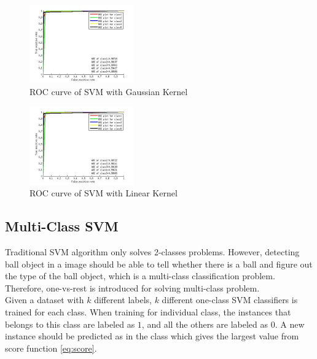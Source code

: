 \documentclass{article}
\begin{document}
\begin{figure}[htb]
\centering
\includegraphics[width = 0.4\textwidth]{ROCgauss.jpg}
\caption{ROC curve of SVM with Gaussian Kernel}
\label{fig:ROC1}
\end{figure}

\begin{figure}[htb]
\centering
\includegraphics[width = 0.4\textwidth]{ROClinear.jpg}
\caption{ROC curve of SVM with Linear Kernel}
\label{fig:ROC2}
\end{figure}
\subsection{Multi-Class SVM}
Traditional SVM algorithm only solves 2-classes problems. However, detecting ball object in a image should be able to tell whether there is a ball and figure out the type of the ball object, which is a multi-class classification problem. Therefore, one-vs-rest is introduced for solving multi-class problem.\\
Given a dataset with $k$ different labels, $k$ different one-class SVM classifiers is trained for each class. When training for individual class, the instances that belongs to this class are labeled as $1$, and all the others are labeled as $0$. A new instance should be predicted as in the class which gives the largest value from score function \ref{eq:score}.\\
\end{document}
